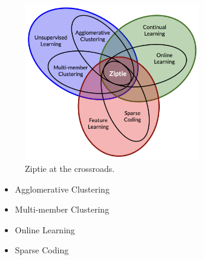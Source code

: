 \begin{figure}[ht]
\vskip 0.2in
\begin{center}
\centerline{\includegraphics[width=3.0in]{images/ziptie_venn.png}}
\caption{Ziptie at the crossroads.}
\label{fig:venn}
\end{center}
\vskip -0.2in
\end{figure}

\begin{itemize}
\item{Agglomerative Clustering}
\item{Multi-member Clustering}
\item{Online Learning}
\item{Sparse Coding}
\end{itemize}
